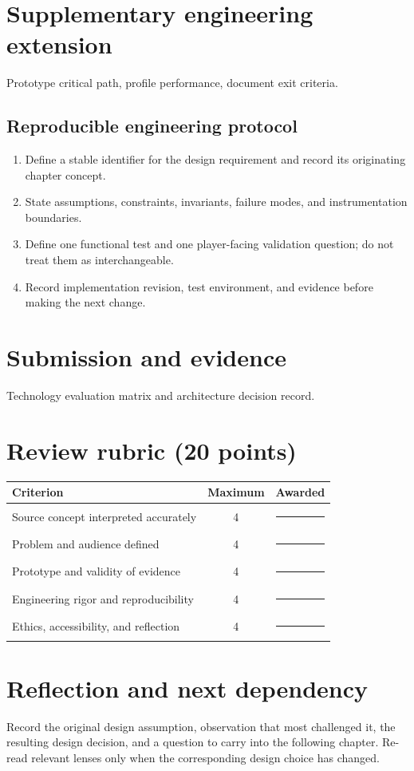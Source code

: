 \documentclass[11pt]{article}
\begin{document}
\section{Supplementary engineering extension}
Prototype critical path, profile performance, document exit criteria.


\subsection{Reproducible engineering protocol}
\begin{enumerate}
\item Define a stable identifier for the design requirement and record its originating chapter concept.
\item State assumptions, constraints, invariants, failure modes, and instrumentation boundaries.
\item Define one functional test and one player-facing validation question; do not treat them as interchangeable.
\item Record implementation revision, test environment, and evidence before making the next change.
\end{enumerate}

\section{Submission and evidence}
Technology evaluation matrix and architecture decision record.


\section{Review rubric (20 points)}
\begin{tabularx}{\linewidth}{@{}Xcc@{}}\toprule
Criterion & Maximum & Awarded \\ \midrule
Source concept interpreted accurately & 4 & \rule{0.45in}{0.4pt}\\
Problem and audience defined & 4 & \rule{0.45in}{0.4pt}\\
Prototype and validity of evidence & 4 & \rule{0.45in}{0.4pt}\\
Engineering rigor and reproducibility & 4 & \rule{0.45in}{0.4pt}\\
Ethics, accessibility, and reflection & 4 & \rule{0.45in}{0.4pt}\\\bottomrule
\end{tabularx}

\section{Reflection and next dependency}
Record the original design assumption, observation that most challenged it, the resulting design decision, and a question to carry into the following chapter. Re-read relevant lenses only when the corresponding design choice has changed.
\end{document}
